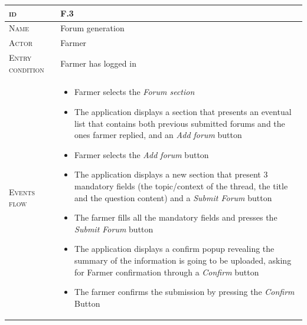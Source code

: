 \begin{table}[H]
    \centering
    \begin{tabular}{|l|m{}|}
        \hline %
    	\textsc{id}                 &   F.3\\
    	\hline %
    	\textsc{Name}               &   Forum generation\\
    	\hline %
    	\textsc{Actor}             &   Farmer\\
    	\hline %
    	\textsc{Entry condition}   &   Farmer has logged in\\
    	\hline %
    	\textsc{Events flow}         &   %
            	                        \begin{itemize}
                                    	    \item Farmer selects the \textit{Forum section}
                                    		\item The application displays a section that presents an eventual list that contains both previous submitted forums and the ones farmer replied, and an \textit{Add forum} button
                                    		\item Farmer selects the \textit{Add forum} button
                                    		\item The application displays a new section that present 3 mandatory fields (the topic/context of the thread, the title and the question content) and a \textit{Submit Forum} button
                                    		\item The farmer fills all the mandatory fields and presses the \textit{Submit Forum} button
                                    		\item The application displays a confirm popup revealing the summary of the information is going to be uploaded, asking for Farmer confirmation through a \textit{Confirm} button
                                    		\item The farmer confirms the submission by pressing the \textit{Confirm} Button
                                        \end{itemize}\\
        \hline %

\end{tabular}
\end{table}

